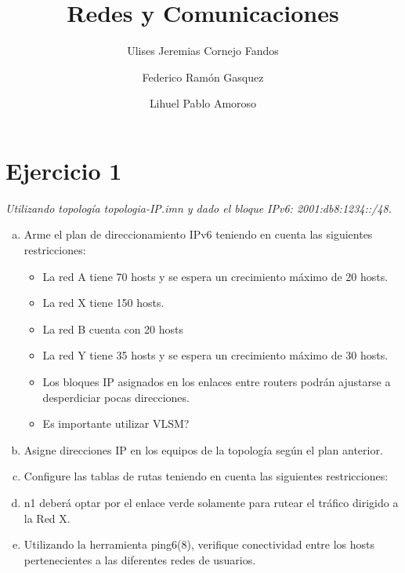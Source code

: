 \documentclass[osajnl,twocolumn,showpacs,superscriptaddress,10pt]{revtex4-1} %
\begin{document}
\title{Redes y Comunicaciones}

\author{Ulises Jeremias Cornejo Fandos}

\author{Federico Ramón Gasquez}

\author{Lihuel Pablo Amoroso}


\maketitle %

\onecolumngrid

\section{Ejercicio 1}

\textit{Utilizando topología topologia-IP.imn y dado el bloque IPv6: 2001:db8:1234::/48.}

\begin{enumerate}[a)]
    \item Arme el plan de direccionamiento IPv6 teniendo en cuenta las siguientes restricciones:
    
    \begin{itemize}
        \item La red A tiene 70 hosts y se espera un crecimiento máximo de 20 hosts.
        \item La red X tiene 150 hosts.
        \item La red B cuenta con 20 hosts
        \item La red Y tiene 35 hosts y se espera un crecimiento máximo de 30 hosts.
        \item Los bloques IP asignados en los enlaces entre routers podrán ajustarse a desperdiciar pocas direcciones.
        \item Es importante utilizar VLSM?
    \end{itemize}

    \item Asigne direcciones IP en los equipos de la topología según el plan anterior.
    \item Configure las tablas de rutas teniendo en cuenta las siguientes restricciones:
    \item n1 deberá optar por el enlace verde solamente para rutear el tráfico dirigido a la Red X.
    \item Utilizando la herramienta ping6(8), verifique conectividad entre los hosts pertenecientes a las diferentes redes de usuarios.
\end{enumerate}
\end{document}
